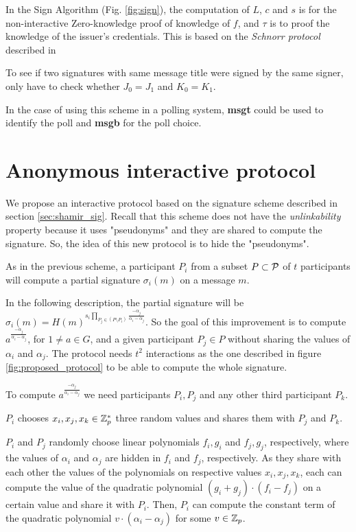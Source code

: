 In the Sign Algorithm (Fig. \ref{fig:sign}), the computation of $L$, $c$ and $s$ is for the non-interactive Zero-knowledge proof of knowledge of $f$, and $\tau$ is to proof the knowledge of the issuer's credentials. This is based on the \textit{Schnorr protocol} described in \cite{Schnorr90}

To see if two signatures with same message title were signed by the same signer, only have to check whether $J_0 = J_1$ and $K_0 = K_1$.

In the case of using this scheme in a polling system, \textbf{msgt} could be used to identify the poll and \textbf{msgb} for the poll choice.

\section{Anonymous interactive protocol}

We propose an interactive protocol based on the signature scheme described in section \ref{sec:shamir_sig}. Recall that this scheme does not have the \textit{unlinkability} property because it uses "pseudonyms" and they are shared to compute the signature. So, the idea of this new protocol is to hide the "pseudonyms".

As in the previous scheme, a participant $P_i$ from a subset $P \subset {\mathcal P}$ of $t$ participants will compute a partial signature $\sigma_i (m)$ on a message $m$.

In the following description, the partial signature will be $\sigma_i (m) = H(m)^{s_i \prod_{P_j \in (P \setminus P_i)} \frac{-\alpha_j}{\alpha_i - \alpha_j}}$. So the goal of this improvement is to compute $a^\frac{-\alpha_j}{\alpha_i - \alpha_j}$, for $1 \neq a \in G$, and a given participant $P_j \in P$ without sharing the values of $\alpha_i$ and $\alpha_j$. The protocol needs $t^2$ interactions as the one described in figure \ref{fig:proposed_protocol} to be able to compute the whole signature.

To compute $a^\frac{-\alpha_j}{\alpha_i - \alpha_j}$ we need participants $P_i,P_j$ and any other third participant $P_k$.

$P_i$ chooses $x_i, x_j, x_k \in {\mathbb Z}^*_p$ three random values and shares them with $P_j$ and $P_k$.

$P_i$ and $P_j$ randomly choose linear polynomials $f_i, g_i$ and $f_j, g_j$, respectively, where the values of $\alpha_i$ and $\alpha_j$ are hidden in $f_i$ and $f_j$, respectively. As they share with each other the values of the polynomials on respective values $x_i, x_j, x_k$, each can compute the value of the quadratic polynomial $(g_i+g_j) \cdot (f_i - f_j)$ on a certain value and share it with $P_i$. Then, $P_i$ can compute the constant term of the quadratic polynomial $v \cdot (\alpha_i - \alpha_j)$ for some $v \in {\mathbb Z}_p$.

